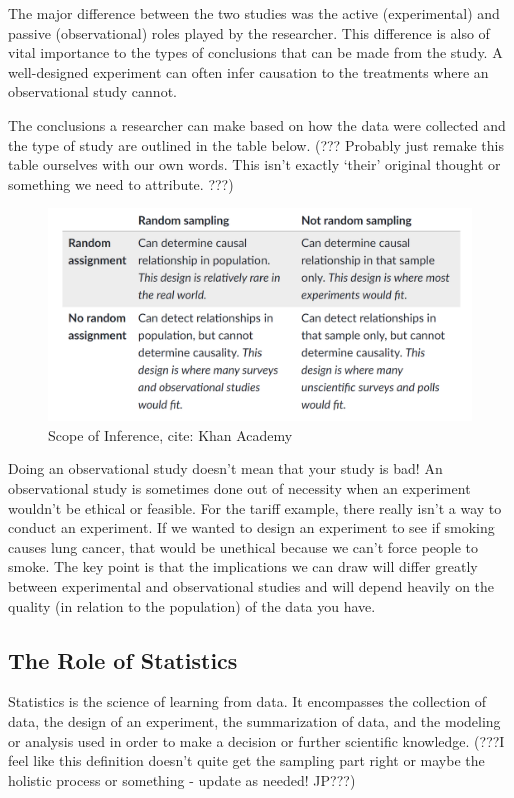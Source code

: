 \documentclass[
]{book}
\theoremstyle{definition}
\theoremstyle{definition}
\theoremstyle{definition}
\theoremstyle{remark}
\begin{document}
The major difference between the two studies was the active (experimental) and passive (observational) roles played by the researcher. This difference is also of vital importance to the types of conclusions that can be made from the study. A well-designed experiment can often infer causation to the treatments where an observational study cannot.

The conclusions a researcher can make based on how the data were collected and the type of study are outlined in the table below. (??? Probably just remake this table ourselves with our own words. This isn't exactly `their' original thought or something we need to attribute. ???)

\begin{figure}
\includegraphics[width=0.8\linewidth]{img/ScopeOfInferenceTable} \caption{Scope of Inference, cite: Khan Academy}\label{fig:scope}
\end{figure}

Doing an observational study doesn't mean that your study is bad! An observational study is sometimes done out of necessity when an experiment wouldn't be ethical or feasible. For the tariff example, there really isn't a way to conduct an experiment. If we wanted to design an experiment to see if smoking causes lung cancer, that would be unethical because we can't force people to smoke. The key point is that the implications we can draw will differ greatly between experimental and observational studies and will depend heavily on the quality (in relation to the population) of the data you have.

\hypertarget{the-role-of-statistics}{%
\subsection{The Role of Statistics}\label{the-role-of-statistics}}

Statistics is the science of learning from data. It encompasses the collection of data, the design of an experiment, the summarization of data, and the modeling or analysis used in order to make a decision or further scientific knowledge. (???I feel like this definition doesn't quite get the sampling part right or maybe the holistic process or something - update as needed! JP???)
\end{document}
